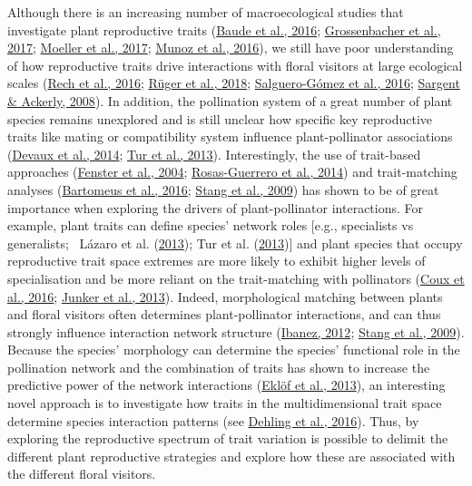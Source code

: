 \documentclass[
  12pt,
  a4paper,
]{article}
\begin{document}
Although there is an increasing number of macroecological studies that investigate plant reproductive traits (\protect\hyperlink{ref-baude2016}{Baude et al., 2016}; \protect\hyperlink{ref-grossenbacher2017}{Grossenbacher et al., 2017}; \protect\hyperlink{ref-moeller2017}{Moeller et al., 2017}; \protect\hyperlink{ref-munoz2016}{Munoz et al., 2016}), we still have poor understanding of how reproductive traits drive interactions with floral visitors at large ecological scales (\protect\hyperlink{ref-rech2016}{Rech et al., 2016}; \protect\hyperlink{ref-ruger2018}{Rüger et al., 2018}; \protect\hyperlink{ref-salguero2016}{Salguero-Gómez et al., 2016}; \protect\hyperlink{ref-sargent2008}{Sargent \& Ackerly, 2008}). In addition, the pollination system of a great number of plant species remains unexplored and is still unclear how specific key reproductive traits like mating or compatibility system influence plant-pollinator associations (\protect\hyperlink{ref-devaux2014}{Devaux et al., 2014}; \protect\hyperlink{ref-tur2013}{Tur et al., 2013}). Interestingly, the use of trait-based approaches (\protect\hyperlink{ref-fenster2004}{Fenster et al., 2004}; \protect\hyperlink{ref-rosas2014}{Rosas-Guerrero et al., 2014}) and trait-matching analyses (\protect\hyperlink{ref-bartomeus2016}{Bartomeus et al., 2016}; \protect\hyperlink{ref-stang2009}{Stang et al., 2009}) has shown to be of great importance when exploring the drivers of plant-pollinator interactions. For example, plant traits can define species' network roles {[}e.g., specialists vs generalists;~ Lázaro et al. (\protect\hyperlink{ref-lazaro2013}{2013}); Tur et al. (\protect\hyperlink{ref-tur2013}{2013}){]} and plant species that occupy reproductive trait space extremes are more likely to exhibit higher levels of specialisation and be more reliant on the trait-matching with pollinators (\protect\hyperlink{ref-coux2016}{Coux et al., 2016}; \protect\hyperlink{ref-junker2013}{Junker et al., 2013}). Indeed, morphological matching between plants and floral visitors often determines plant-pollinator interactions, and can thus strongly influence interaction network structure (\protect\hyperlink{ref-ibanez2012}{Ibanez, 2012}; \protect\hyperlink{ref-stang2009}{Stang et al., 2009}). Because the species' morphology can determine the species' functional role in the pollination network and the combination of traits has shown to increase the predictive power of the network interactions (\protect\hyperlink{ref-eklof2013}{Eklöf et al., 2013}), an interesting novel approach is to investigate how traits in the multidimensional trait space determine species interaction patterns (see \protect\hyperlink{ref-dehling2016}{Dehling et al., 2016}). Thus, by exploring the reproductive spectrum of trait variation is possible to delimit the different plant reproductive strategies and explore how these are associated with the different floral visitors.
\end{document}
